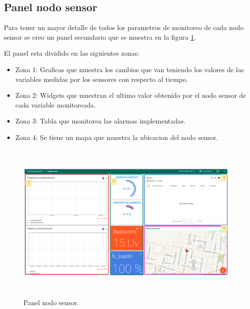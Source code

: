 \clearpage
\subsection{Panel nodo sensor} 

Para tener un mayor detalle de todos los parametros de monitoreo de cada nodo sensor se creo un panel secundario que se muestra en la figura \ref{fig:Panel nodo sensor}.

El panel esta dividido en las siguientes zonas:
\begin{itemize}
  \item Zona 1: Graficas que muestra los cambios que van teniendo los valores de las variables medidas por los sensores con respecto al tiempo.
  \item Zona 2: Widgets que muestran el ultimo valor obtenido por el nodo sensor de cada variable monitoreada.
  \item Zona 3: Tabla que monitorea las alarmas implementadas. 
  \item Zona 4: Se tiene un mapa que muestra la ubicacion del nodo sensor.
\end{itemize}

\begin{figure}[h!]
  \centering
	\includegraphics[width=\textwidth, height=8cm]{./Figures/panel_nodosensor_editado.png}
  \caption{Panel nodo sensor.}
	\label{fig:Panel nodo sensor}
\end{figure}